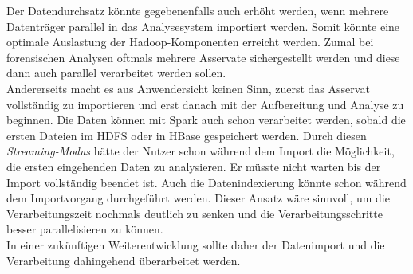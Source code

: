 \noindent
Der Datendurchsatz könnte gegebenenfalls auch erhöht werden, wenn mehrere Datenträger parallel in das Analysesystem importiert werden. 
Somit könnte eine optimale Auslastung der Hadoop-Komponenten erreicht werden. Zumal bei forensischen Analysen oftmals mehrere Asservate sichergestellt werden und diese dann auch parallel verarbeitet werden sollen.\\

\noindent
Andererseits macht es aus Anwendersicht keinen Sinn, zuerst das Asservat vollständig zu importieren und erst danach mit der Aufbereitung und Analyse zu beginnen. Die Daten können mit Spark auch schon verarbeitet werden, sobald die ersten Dateien im HDFS oder in HBase gespeichert werden. Durch diesen \textit{Streaming-Modus} hätte der Nutzer schon während dem Import die Möglichkeit, die ersten eingehenden Daten zu analysieren. Er müsste nicht warten bis der Import vollständig beendet ist. Auch die Datenindexierung könnte schon während dem Importvorgang durchgeführt werden. Dieser Ansatz wäre sinnvoll, um die Verarbeitungszeit nochmals deutlich zu senken und die Verarbeitungsschritte besser parallelisieren zu können.\\
In einer zukünftigen Weiterentwicklung sollte daher der Datenimport und die Verarbeitung dahingehend überarbeitet werden.